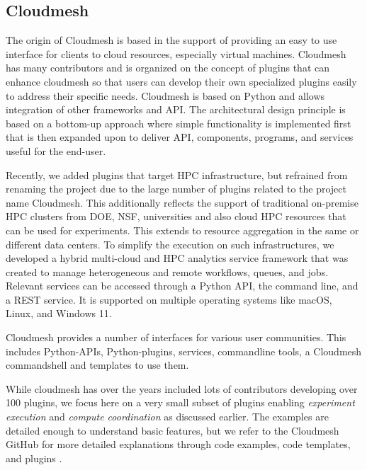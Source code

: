 \documentclass[sigconf]{acmart}
\begin{document}

\subsection{Cloudmesh}
\label{sec:cloudmesh}

The origin of Cloudmesh is based in the support of providing an easy to use interface for clients to cloud resources, especially virtual machines. Cloudmesh has many contributors and is organized on the concept of plugins that can enhance cloudmesh so that users can develop their own specialized plugins easily to address their specific needs.  Cloudmesh is based on Python and allows integration of other frameworks and API. The architectural design principle is based on a bottom-up approach where simple functionality is implemented first that is then expanded upon to deliver API, components, programs, and services  useful for the end-user.

Recently, we added plugins that target HPC infrastructure, but refrained from renaming the project due to the large number of plugins related to the project name Cloudmesh. This additionally reflects the support of traditional on-premise HPC clusters from DOE, NSF, universities and also cloud HPC resources that can be used for experiments.  This extends to resource aggregation in the same or different data centers. To simplify the execution on such infrastructures, we developed a hybrid multi-cloud and HPC analytics service framework that was created to manage heterogeneous and remote workflows, queues, and jobs. Relevant services can be accessed through a Python API, the command line, and a REST service. It is supported on multiple operating systems like macOS, Linux, and Windows 11.  

Cloudmesh provides a number of interfaces for various user communities. This includes Python-APIs, Python-plugins, services, commandline tools, a Cloudmesh commandshell and templates to use them.

While cloudmesh has over the years included lots of contributors developing over 100 plugins, we focus here on a very small subset of plugins enabling {\em experiment execution} and {\em compute coordination} as discussed earlier. 
The examples are detailed enough to understand basic features, but we refer to the Cloudmesh GitHub for more detailed explanations through code examples, code templates, and plugins \citep{www-cloudmesh-org}.

\end{document}
